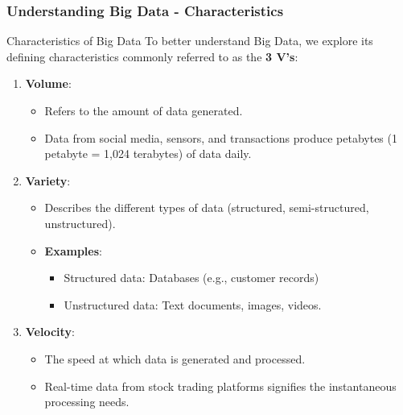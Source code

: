 \documentclass[aspectratio=169]{beamer}
\begin{document}
\begin{frame}[fragile]
    \frametitle{Understanding Big Data - Characteristics}
    \begin{block}{Characteristics of Big Data}
        To better understand Big Data, we explore its defining characteristics commonly referred to as the \textbf{3 V's}:
    \end{block}
    \begin{enumerate}
        \item \textbf{Volume}:
        \begin{itemize}
            \item Refers to the amount of data generated. 
            \item Data from social media, sensors, and transactions produce petabytes (1 petabyte = 1,024 terabytes) of data daily.
        \end{itemize}
        
        \item \textbf{Variety}:
        \begin{itemize}
            \item Describes the different types of data (structured, semi-structured, unstructured).
            \item \textbf{Examples}:
                \begin{itemize}
                    \item Structured data: Databases (e.g., customer records)
                    \item Unstructured data: Text documents, images, videos.
                \end{itemize}
        \end{itemize}
        
        \item \textbf{Velocity}:
        \begin{itemize}
            \item The speed at which data is generated and processed.
            \item Real-time data from stock trading platforms signifies the instantaneous processing needs.
        \end{itemize}
    \end{enumerate}
\end{frame}
\end{document}
